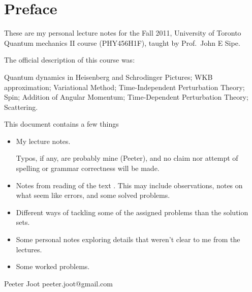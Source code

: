 \chapter*{Preface}\normalsize

These are my personal lecture notes for the Fall 2011, University of Toronto Quantum mechanics II course (PHY456H1F), taught by Prof.\ John E Sipe.

The official description of this course was:

Quantum dynamics in Heisenberg and Schrodinger Pictures; WKB approximation; Variational Method; Time-Independent Perturbation Theory; Spin; Addition of Angular Momentum; Time-Dependent Perturbation Theory; Scattering.

This document contains a few things

\begin{itemize}
\item My lecture notes.

Typos, if any, are probably mine (Peeter), and no claim nor attempt of spelling or grammar correctness will be made.

\item Notes from reading of the text \citep{desai2009quantum}.  This may include observations, notes on what seem like errors, and some solved problems.

\item Different ways of tackling some of the assigned problems than the solution sets.

\item Some personal notes exploring details that weren't clear to me from the lectures.

\item Some worked problems.

\end{itemize}

Peeter Joot  \quad peeter.joot@gmail.com 

